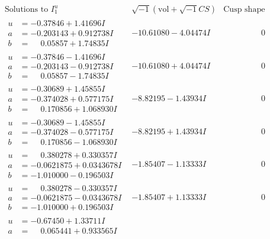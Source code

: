 \documentclass[1p]{elsarticle_modified}
\theoremstyle{definition}
\newcommand{\I}{\sqrt{-1}}
\begin{document}
$$\begin{array}{c|c|c}
\text{Solutions to }I^u_{1}& \I (\text{vol} + \sqrt{-1}CS) & \text{Cusp shape}\\
 \hline 
\begin{aligned}
u &= -0.37846 + 1.41696 I \\
a &= -0.203143 + 0.912738 I \\
b &= \phantom{-}0.05857 + 1.74835 I\end{aligned}
 & -10.61080 - 4.04474 I & \phantom{-0.000000 } 0 \\ \hline\begin{aligned}
u &= -0.37846 - 1.41696 I \\
a &= -0.203143 - 0.912738 I \\
b &= \phantom{-}0.05857 - 1.74835 I\end{aligned}
 & -10.61080 + 4.04474 I & \phantom{-0.000000 } 0 \\ \hline\begin{aligned}
u &= -0.30689 + 1.45855 I \\
a &= -0.374028 + 0.577175 I \\
b &= \phantom{-}0.170856 + 1.068930 I\end{aligned}
 & -8.82195 - 1.43934 I & \phantom{-0.000000 } 0 \\ \hline\begin{aligned}
u &= -0.30689 - 1.45855 I \\
a &= -0.374028 - 0.577175 I \\
b &= \phantom{-}0.170856 - 1.068930 I\end{aligned}
 & -8.82195 + 1.43934 I & \phantom{-0.000000 } 0 \\ \hline\begin{aligned}
u &= \phantom{-}0.380278 + 0.330357 I \\
a &= -0.0621875 + 0.0343678 I \\
b &= -1.010000 - 0.196503 I\end{aligned}
 & -1.85407 - 1.13333 I & \phantom{-0.000000 } 0 \\ \hline\begin{aligned}
u &= \phantom{-}0.380278 - 0.330357 I \\
a &= -0.0621875 - 0.0343678 I \\
b &= -1.010000 + 0.196503 I\end{aligned}
 & -1.85407 + 1.13333 I & \phantom{-0.000000 } 0 \\ \hline\begin{aligned}
u &= -0.67450 + 1.33711 I \\
a &= \phantom{-}0.065441 + 0.933565 I \\

\end{aligned}
\end{array}$$
\end{document}
